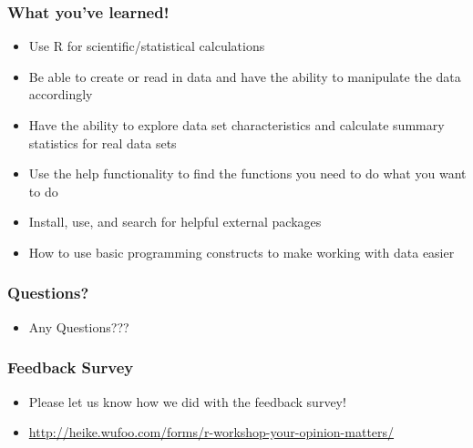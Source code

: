 \documentclass[10pt]{beamer}\usepackage[]{graphicx}\usepackage[]{color}
\begin{document}
\begin{frame}
    \frametitle{What you've learned!}
    \begin{itemize}
        \item Use R for scientific/statistical calculations
        \item Be able to create or read in data and have the ability to manipulate the data accordingly
        \item Have the ability to explore data set characteristics and calculate summary statistics for real data sets
        \item Use the help functionality to find the functions you need to do what you want to do
        \item Install, use, and search for helpful external packages
        \item How to use basic programming constructs to make working with data easier
  \end{itemize}
\end{frame}


\begin{frame}
    \frametitle{Questions?}
    \begin{itemize}
        \item Any Questions???
  \end{itemize}
\end{frame}



\begin{frame}
    \frametitle{Feedback Survey}
    \begin{itemize}
        \item Please let us know how we did with the feedback survey!
    \item  \url{http://heike.wufoo.com/forms/r-workshop-your-opinion-matters/}
  \end{itemize}
\end{frame}
\end{document}
